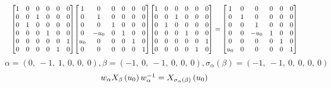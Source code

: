 \documentclass[11pt]{article}
\theoremstyle{definition}
\begin{document}
\[
\scaletoalign{\textwidth}{{\left[\begin{matrix}1 & 0 & 0 & 0 & 0 & 0\\0 & 0 & 1 & 0 & 0 & 0\\0 & 1 & 0 & 0 & 0 & 0\\0 & 0 & 0 & 1 & 0 & 0\\0 & 0 & 0 & 0 & 0 & 1\\0 & 0 & 0 & 0 & 1 & 0\end{matrix}\right]} {\left[\begin{matrix}1 & 0 & 0 & 0 & 0 & 0\\0 & 1 & 0 & 0 & 0 & 0\\0 & 0 & 1 & 0 & 0 & 0\\0 & - u_{0} & 0 & 1 & 0 & 0\\u_{0} & 0 & 0 & 0 & 1 & 0\\0 & 0 & 0 & 0 & 0 & 1\end{matrix}\right]} {\left[\begin{matrix}1 & 0 & 0 & 0 & 0 & 0\\0 & 0 & 1 & 0 & 0 & 0\\0 & 1 & 0 & 0 & 0 & 0\\0 & 0 & 0 & 1 & 0 & 0\\0 & 0 & 0 & 0 & 0 & 1\\0 & 0 & 0 & 0 & 1 & 0\end{matrix}\right]} = {\left[\begin{matrix}1 & 0 & 0 & 0 & 0 & 0\\0 & 1 & 0 & 0 & 0 & 0\\0 & 0 & 1 & 0 & 0 & 0\\0 & 0 & - u_{0} & 1 & 0 & 0\\0 & 0 & 0 & 0 & 1 & 0\\u_{0} & 0 & 0 & 0 & 0 & 1\end{matrix}\right]}}
\]
\[
\alpha = \left( 0, \  -1, \  1, \  0, \  0, \  0\right), \beta = \left( -1, \  0, \  -1, \  0, \  0, \  0\right), \sigma_{\alpha}(\beta) = \left( -1, \  -1, \  0, \  0, \  0, \  0\right)
\]
\[
\scaletoalign{\textwidth}{w_{\alpha} X_{\beta}\left(u_{0}\right) w_{\alpha}^{-1} = X_{\sigma_{\alpha}\left(\beta\right)}\left(u_{0}\right)}
\]
\end{document}
